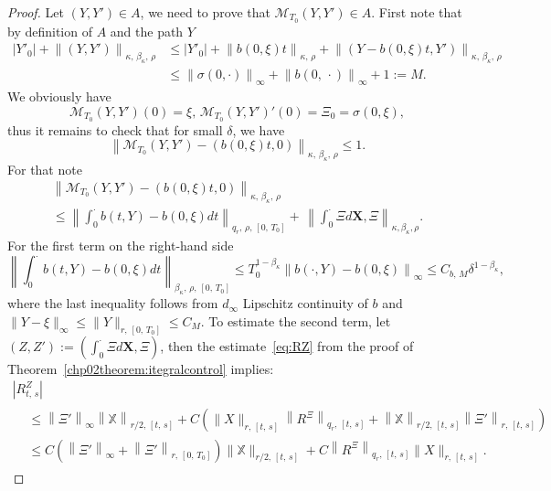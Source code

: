 \documentclass[10pt]{amsart}
\theoremstyle{definition}\newtheorem{defi}[theo]{Definition}\newtheorem{rema}[theo]{Remark}\newtheorem{exam}[theo]{Example}\newtheorem{exem}[theo]{Example}\newtheorem{nota}[theo]{Notation}
\newcommand{\bbX}{\mathbb{X}}
\newcommand{\calM}{\mathcal{M}}
\begin{document}
\begin{proof}
Let $(Y,Y')\in A$, we need to prove that $\calM_{T_0}(Y,Y')\in A.$ First note that by definition of $A$ and the path $Y$
\begin{equation}
\begin{split}
\left|Y'_0\right|+\left\|\left(Y,Y'\right)\right\|_{\kappa,\,\beta_{\kappa},\,\rho}&\leq \left|Y'_0\right|+\left\|b\left(0, \xi\right) t\right\|_{\kappa,\,\rho}+\left\|\left(Y-b(0,\xi) t,Y'\right)\right\|_{\kappa,\,\beta_{\kappa},\,\rho}\\
&\leq \left\|\sigma(0,\cdot)\right\|_{\infty}+\left\|b(0,\,\cdot)\right\|_{\infty}+1:=M.
\end{split}
\end{equation}
We obviously have
\[
\calM_{T_0}\left(Y,Y'\right)(0)=\xi,\, \calM_{T_0}\left(Y,Y'\right)'(0)=\Xi_0=\sigma\left(0, \xi\right),
\]
thus it remains to check that for small $\delta$, we have
\[
\left\|\calM_{T_0}\left(Y,Y'\right)-(b(0, \xi)t, 0)\right\|_{\kappa,\,\beta_{\kappa},\,\rho}\leq 1.
\]
For that note
\begin{multline}
\left\|\calM_{T_0}(Y,Y')-(b(0, \xi)t, 0)\right\|_{\kappa,\,\beta_{\kappa},\,\rho}\\
\leq \left\|\int_0^{\cdot}b(t, Y)-b(0, \xi) dt\right\|_{q_{r},\,\rho,\,[0,\,T_0]}+\,\left\|\int_0^{\cdot}\Xi d\bm{X}, \Xi\right\|_{\kappa,\beta_{\kappa},\rho}.
\end{multline} 
For the first term on the right-hand side
\[
\left\|\int_0^{\cdot}b(t, Y)-b(0, \xi) dt\right\|_{\beta_{\kappa},\,\rho,\,\left[0,\,T_0\right]}\leq T_0^{1-\beta_{\kappa}}\left\|b(\cdot, Y)-b(0, \xi)\right\|_{\infty}\leq C_{b,\,M}\delta^{1-\beta_{\kappa}},
\]
where the last inequality follows from $d_{\infty}$ Lipschitz continuity of $b$ and $\|Y-\xi\|_\infty\leq \|Y\|_{r,\,[0,\,T_0]}\leq C_{M}$. To estimate the second term, let $(Z, Z'):=\left(\int_0^{\cdot}\Xi d\bm{X}, \Xi\right)$, then the estimate~\eqref{eq:RZ} from the proof of Theorem~\ref{chp02theorem:itegralcontrol} implies:
\begin{multline}\label{eq:RZ0}
\left|R^Z_{t,\,s}\right|\\
\begin{aligned}
&\leq \left\|\Xi'\right\|_{\infty}\left\|\bbX\right\|_{r/2,\,[t,\,s]}+ C\left(\|X\|_{r,\,[t,\,s]}\left\|R^{\Xi}\right\|_{q_{r},\,[t,\,s]}+\left\|\bbX\right\|_{r/2,\,[t,\,s]}\left\|\Xi'\right\|_{r,\,[t,\,s]}\right)\\
&\leq C\left(\left\|\Xi'\right\|_{\infty}+\left\|\Xi'\right\|_{r,\,[0,\,T_0]}\right)\|\bbX\|_{r/2,\,[t,\,s]}+C\left\|R^{\Xi}\right\|_{q_{r},\,[t,\,s]}\|X\|_{r,\,[t,\,s]}.
\end{aligned}
\end{multline}


\end{proof}
\end{document}
